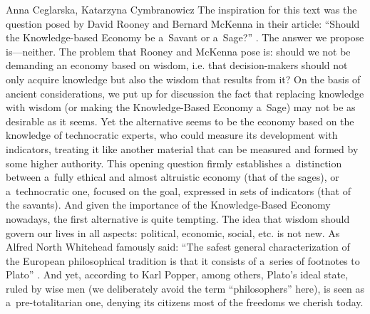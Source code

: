 \begin{artengenv2auth}{Anna Ceglarska, Katarzyna Cymbranowicz}
\lettrine[loversize=0.13,lines=2,lraise=-0.03,nindent=0em,findent=0.2pt]%
{T}{}he inspiration for this text was the question posed by David Rooney and Bernard McKenna in their article: ``Should the Knowledge-based Economy be a~Savant or a~Sage?'' 
\parencite*[][]{rooney_should_2005}. %
 The answer we propose is---neither. The problem that Rooney and McKenna pose is: should we not be demanding an economy based on wisdom, i.e. that decision-makers should not only acquire knowledge but also the wisdom that results from it? On the basis of ancient considerations, we put up for discussion the fact that replacing knowledge with wisdom (or making the Knowledge-Based Economy a~Sage) may not be as desirable as it seems. Yet the alternative seems to be the economy based on the knowledge of technocratic experts, who could measure its development with indicators, treating it like another material that can be measured and formed by some higher authority. This opening question firmly establishes a~distinction between a~fully ethical and almost altruistic economy (that of the sages), or a~technocratic one, focused on the goal, expressed in sets of indicators (that of the savants). And given the importance of the Knowledge-Based Economy nowadays, the first alternative is quite tempting. The idea that wisdom should govern our lives in all aspects: political, economic, social, etc. is not new. As Alfred North Whitehead famously said: ``The safest general characterization of the European philosophical tradition is that it consists of a~series of footnotes to Plato'' 
\parencite[][p.39]{whitehead_process_2010}. %
 And yet, according to Karl Popper, among others, Plato's ideal state, ruled by wise men (we deliberately avoid the term ``philosophers'' here), is seen as a~pre-totalitarian one, denying its citizens most of the freedoms we cherish today.




\end{artengenv2auth}
